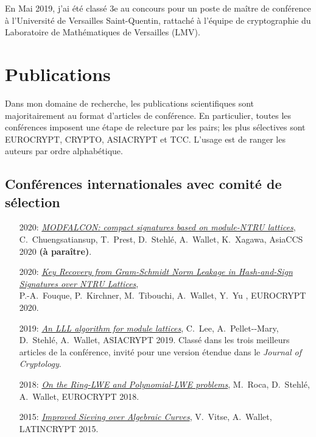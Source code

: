 \documentclass[11pt]{article}
\newcommand{\cs}{\cb{s}}
\begin{document}
En Mai 2019, j'ai été classé 3e au concours pour un poste de maître de conférence à l'Université de Versailles Saint-Quentin, rattaché à l'équipe de cryptographie du Laboratoire de Mathématiques de Versailles (LMV).


\section{Publications}

Dans mon domaine de recherche, les publications scientifiques sont majoritairement au format d'articles de conférence.
En particulier, toutes les conférences imposent une étape de relecture par les pairs; les plus sélectives sont EUROCRYPT, CRYPTO, ASIACRYPT et TCC.
L'usage est de ranger les auteurs par ordre alphabétique.

\subsection*{Conférences internationales avec comité de sélection}

\begin{itemize}
  
\item[2020:] \href{https://eprint.iacr.org/2019/1456}{\em MODFALCON: compact signatures based on module-NTRU lattices}, C.~Chuengsatiansup, T.~Prest, D.~Stehlé, A.~Wallet, K.~Xagawa, AsiaCCS 2020 \textbf{(à paraître)}.
  
\item[2020:] \href{https://eprint.iacr.org/2019/1180.pdf}{\em Key Recovery from Gram-Schmidt Norm Leakage in Hash-and-Sign Signatures over NTRU Lattices},\\ P.-A.~Fouque, P.~Kirchner, M.~Tibouchi, A.~Wallet, Y.~Yu , EUROCRYPT 2020.
\item[2019:]  \href{https://eprint.iacr.org/2019/1035.pdf}{\em An LLL algorithm for module lattices}, C.~Lee, A.~Pellet-\hspace{.1pt}-Mary, D.~Stehlé, A.~Wallet, ASIACRYPT 2019.
  Classé dans les trois meilleurs articles de la conférence, invité pour une version étendue dans le {\em Journal of Cryptology}.

\item[2018:] \href{https://eprint.iacr.org/2018/170.pdf}{\em On the Ring-LWE and Polynomial-LWE problems}, M.~Ro\cs ca, D.~Stehlé, A.~Wallet, EUROCRYPT 2018.
\item[2015:] \href{http://hal.upmc.fr/hal-01203086/document}{\em Improved Sieving over Algebraic Curves}, V.~Vitse, A.~Wallet, LATINCRYPT 2015.
\end{itemize}
\end{document}
